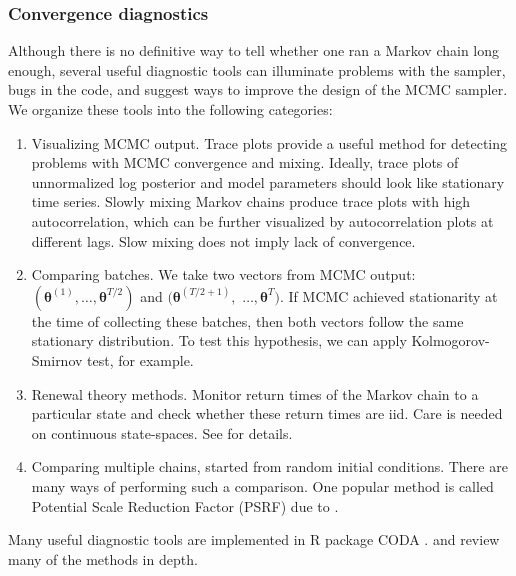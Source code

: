 \documentclass[11pt]{article}\usepackage[]{graphicx}\usepackage[]{color}
\numberwithin{algorithm}{section}
\theoremstyle{remark}
\theoremstyle{definition}
\begin{document}
\subsubsection{Convergence diagnostics}
Although there is no definitive way to tell whether one ran a Markov chain long enough, several useful
diagnostic tools can illuminate problems with the sampler, bugs in the code, and suggest ways to improve
the design of the MCMC sampler. We organize these tools into the following categories:
\begin{enumerate}
\item Visualizing MCMC output. Trace plots provide a useful method for detecting problems with MCMC convergence 
  and mixing. Ideally, trace plots of unnormalized log posterior and model parameters should look like stationary
  time series. Slowly mixing Markov chains produce trace plots with high autocorrelation, which can be further 
  visualized by autocorrelation plots at different lags. Slow mixing does not imply lack of convergence.
\item Comparing batches. We take two vectors from MCMC output: 
  $(\boldsymbol{\theta}^{(1)},\dots,\boldsymbol{\theta}^{T/2})$ and 
  $(\boldsymbol{\theta}^{(T/2+1)},$ $\dots, \boldsymbol{\theta}^{T})$. If MCMC achieved stationarity at the time of 
  collecting these batches, then both vectors follow the same stationary distribution. To test this hypothesis,
  we can apply Kolmogorov-Smirnov test, for example.
\item Renewal theory methods. Monitor return times of the Markov chain to a particular state and check whether
  these return times are iid. Care is needed on continuous state-spaces. See \citep{Mykland1995} for details.
\item Comparing multiple chains, started from random initial conditions. There are many ways of performing such
  a comparison. One popular method is called Potential Scale Reduction Factor (PSRF) due to \citet{Gelman1992}.
\end{enumerate}
Many useful diagnostic tools are implemented in R package CODA \citep{Plummer2006}. \citet{Cowles1995} and 
\citet{Brooks1998b} review many of the methods in depth.
\end{document}
